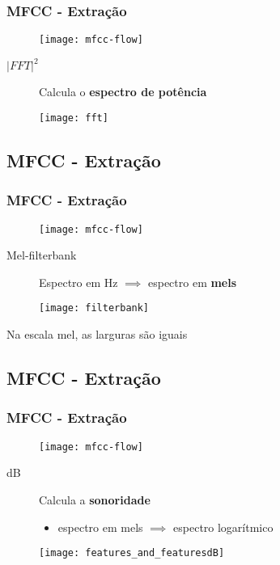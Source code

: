 \begin{frame}
\frametitle{MFCC - Extração}
\begin{figure}[ht]
    \centering
    \texttt{[image: mfcc-flow]}
\end{figure}

\begin{description}
    \item[$|FFT|^2$] Calcula o \textbf{espectro de potência}
\end{description}
\begin{figure}[ht]
    \centering
    \texttt{[image: fft]}
\end{figure}
\end{frame}

\subsection{MFCC - Extração}

\begin{frame}
\frametitle{MFCC - Extração}
\begin{figure}[ht]
    \centering
    \texttt{[image: mfcc-flow]}
\end{figure}

\begin{description}
    \item[Mel-filterbank] Espectro em Hz $\implies$ espectro em \textbf{mels}
\end{description}
\begin{figure}[ht]
    \centering
    \texttt{[image: filterbank]}
\end{figure}

\begin{description}
    \item Na escala mel, as larguras são iguais
\end{description}
\end{frame}

\subsection{MFCC - Extração}

\begin{frame}
\frametitle{MFCC - Extração}
\begin{figure}[ht]
    \centering
    \texttt{[image: mfcc-flow]}
\end{figure}

\begin{description}
    \item[dB] Calcula a \textbf{sonoridade}
    \begin{itemize}
        \item espectro em mels $\implies$ espectro logarítmico
    \end{itemize}
\end{description}
\begin{figure}[ht]
    \centering
    \texttt{[image: features\_and\_featuresdB]}
\end{figure}
\end{frame}

